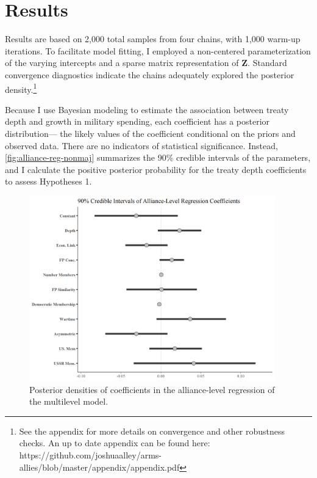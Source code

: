 \documentclass[12pt]{article}
\begin{document}
\section{Results}


Results are based on 2,000 total samples from four chains, with 1,000 warm-up iterations. 
To facilitate model fitting, I employed a non-centered parameterization of the varying intercepts and a sparse matrix representation of \textbf{Z}. 
Standard convergence diagnostics indicate the chains adequately explored the posterior density.\footnote{See the appendix for more details on convergence and other robustness checks. An up to date appendix can be found here: https://github.com/joshuaalley/arms-allies/blob/master/appendix/appendix.pdf} 


Because I use Bayesian modeling to estimate the association between treaty depth and growth in military spending, each coefficient has a posterior distribution--- the likely values of the coefficient conditional on the priors and observed data.
There are no indicators of statistical significance. 
Instead, \autoref{fig:alliance-reg-nonmaj} summarizes the 90\% credible intervals of the parameters, and I calculate the positive posterior probability for the treaty depth coefficients to assess Hypotheses 1.


\begin{figure}[htbp]
	\centering
		\includegraphics[width=0.95\textwidth]{../figures/alliance-reg-nonmaj.png}
	\caption{Posterior densities of coefficients in the alliance-level regression of the multilevel model. }
	\label{fig:alliance-reg-nonmaj}
\end{figure}
\end{document}
